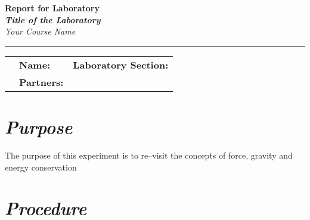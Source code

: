 \documentclass[epsfig,12pt]{article}
\begin{document}
\begin{center}
	\textbf{ \huge \color{RoyalBlue} Report for Laboratory \underline{\hskip 1cm}  }\\[2mm]
	\textbf{\textit{ \Large \color{VioletRed} Title of the Laboratory  }}\\[2mm]
	\textit{ \large \color{BlueViolet} Your Course Name  }
\end{center}
\hrule
\bigskip
\begin{tabularx}{\textwidth}{lXr}
%
	&
	\textbf{Name:}
	&
	\textbf{Laboratory Section:}
	\hspace{1.0cm}
	\\[2mm]
%
	&
	\textbf{Partners:}
\end{tabularx}
\medskip


\section*{\textit{Purpose}}

	The purpose of this experiment is to re--visit the concepts of force, gravity
	and energy conservation


\section*{\textit{Procedure}}
\end{document}
